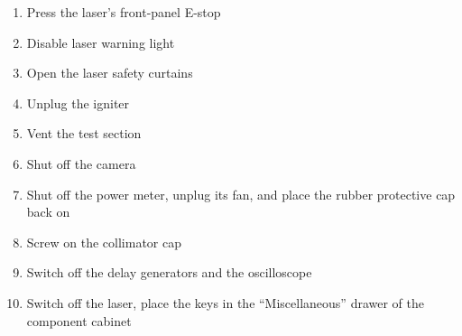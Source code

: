 \begin{enumerate}
\def\labelenumi{\arabic{enumi}.}
\item
  Press the laser's front-panel E-stop

\item
  Disable laser warning light
\item
  Open the laser safety curtains
\item
  Unplug the igniter
\item
  Vent the test section
\item
  Shut off the camera
\item
  Shut off the power meter, unplug its fan, and place the rubber
  protective cap back on
\item
  Screw on the collimator cap
\item
  Switch off the delay generators and the oscilloscope
\item
  Switch off the laser, place the keys in the ``Miscellaneous'' drawer
  of the component cabinet
\end{enumerate}